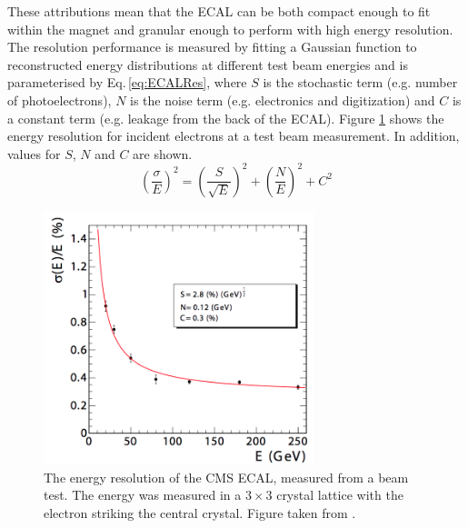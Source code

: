 These attributions mean that the ECAL can be both compact enough to fit within the magnet and granular enough to perform with high energy resolution.
The resolution performance is measured by fitting a Gaussian function to reconstructed energy distributions at different test beam energies and is parameterised by Eq.\,\ref{eq:ECALRes}, where $S$ is the stochastic term (e.g. number of photoelectrons), $N$ is the noise term (e.g. electronics and digitization) and $C$ is a constant term (e.g. leakage from the back of the ECAL).
Figure \ref{fig:CMSECALRes} shows the energy resolution for incident electrons at a test beam measurement. In addition, values for $S$, $N$ and $C$ are shown.
\begin{equation} \label{eq:ECALRes}
	\left(\frac{\sigma}{E}\right)^{2} = \left(\frac{S}{\sqrt{E}}\right)^{2} + \left(\frac{N}{E}\right)^{2} + C^{2}
\end{equation}
\begin{figure}[htpb]
	\centering
	\includegraphics[width=0.7\textwidth]{Figures/CMSECALRES}
	\caption[The energy resolution of the CMS ECAL, measured from a beam test. The energy was measured in a $3\times3$ crystal lattice with the electron striking the central crystal.]{The energy resolution of the CMS ECAL, measured from a beam test. The energy was measured in a $3\times3$ crystal lattice with the electron striking the central crystal. Figure taken from \cite{CMSExperiment}.}
	\label{fig:CMSECALRes}
\end{figure}

